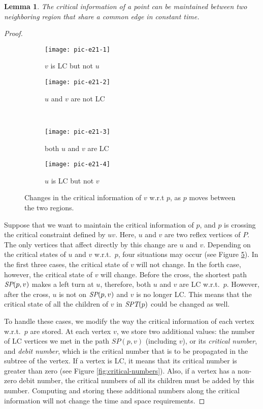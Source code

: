 \documentclass[5p]{elsarticle}
\newtheorem{lemma}[theorem]{Lemma}
\def\SPT{\mbox{\it{SPT}}}
\def\SP{\mbox{\it{SP}}}
\def\P{\mbox{${P}$}}
\begin{document}
\begin{lemma} \label{lem:lemma5}
The critical information of a point can be maintained
between two neighboring region that share a common edge in constant time.
\end{lemma}
\begin{proof}
\begin{figure}	
	\centering
	\begin{subfigure}[b]{0.23\textwidth}
		\centering
		\texttt{[image: pic-e21-1]}
		\caption{$v$ is LC but not $u$}\label{fig:e2-1a}		
	\end{subfigure}
	\begin{subfigure}[b]{0.23\textwidth}
		\centering
		\texttt{[image: pic-e21-2]}
		\caption{$u$ and $v$ are not LC}\label{fig:e2-1b}		
	\end{subfigure}
	\\
	\begin{subfigure}[b]{0.23\textwidth}
		\centering
		\texttt{[image: pic-e21-3]}
		\caption{both $u$ and $v$ are LC}\label{fig:e2-1c}		
	\end{subfigure}
	\begin{subfigure}[b]{0.23\textwidth}
		\centering
		\texttt{[image: pic-e21-4]}
		\caption{$u$ is LC but not $v$}\label{fig:e2-1d}		
	\end{subfigure}
  \caption{Changes in the critical information of $v$ w.r.t $p$, as $p$ moves between the two regions.}
  \label{fig:e2-1}
\end{figure}


Suppose that we want to maintain the critical
information of $p$, and $p$ is crossing the critical constraint
defined by $uv$. Here, $u$ and $v$ are two 
reflex vertices of $\P$. The only vertices that affect directly by this change
are $u$ and $v$. Depending on the critical states of $u$ and $v$
w.r.t.\ $p$, four situations may occur (see Figure \ref{fig:e2-1}). In the
first three cases, the critical state of $v$ will not change. In
the forth case, however, the critical state of $v$ will change.
Before the cross, the shortest path $\SP(p,v)$ makes a left turn at $u$,
therefore, both $u$ and $v$ are LC w.r.t.\ $p$. However, after the cross, 
$u$ is not on $\SP(p,v)$ and $v$ is no longer LC. 
This means that the critical state of all the children of 
$v$ in $\SPT(p)$ could be changed as well.

To handle these cases, we modify the way the critical information of each vertex 
w.r.t.\ $p$ are stored. At each vertex $v$, we store two additional values: the number 
of LC vertices we met in the path $SP(p,v)$ (including $v$), or its {\em critical number}, 
and {\em debit number}, which is the critical number that is to be propagated in the 
subtree of the vertex. If a vertex is LC, it means that its critical number 
is greater than zero (see Figure \ref{fig:critical-numbers}). Also, if a vertex has 
a non-zero debit number, the critical numbers of all its children must be added by this
number. Computing and storing these additional numbers along the critical information 
will not change the time and space requirements.


\end{proof}
\end{document}
